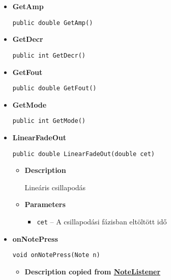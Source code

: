 {{{{{{{{{{{{{{\begin{itemize}
{\begin{itemize}
{Kör-menti csillapodás
}
\item{
{\bf  Parameters}
  \begin{itemize}
   \item{
\texttt{cet} -- A csillapodási fázisban eltöltött idő}
  \end{itemize}
}%
\end{itemize}
}%
\item{ 
\hypertarget{main.OSC.GetAmp()}{{\bf  GetAmp}\\}
\begin{lstlisting}[frame=none]
public double GetAmp()\end{lstlisting} %
}%
\item{ 
\hypertarget{main.OSC.GetDecr()}{{\bf  GetDecr}\\}
\begin{lstlisting}[frame=none]
public int GetDecr()\end{lstlisting} %
}%
\item{ 
\hypertarget{main.OSC.GetFout()}{{\bf  GetFout}\\}
\begin{lstlisting}[frame=none]
public double GetFout()\end{lstlisting} %
}%
\item{ 
\hypertarget{main.OSC.GetMode()}{{\bf  GetMode}\\}
\begin{lstlisting}[frame=none]
public int GetMode()\end{lstlisting} %
}%
\item{ 
\hypertarget{main.OSC.LinearFadeOut(double)}{{\bf  LinearFadeOut}\\}
\begin{lstlisting}[frame=none]
public double LinearFadeOut(double cet)\end{lstlisting} %
\begin{itemize}
\item{
{\bf  Description}

Lineáris csillapodás
}
\item{
{\bf  Parameters}
  \begin{itemize}
   \item{
\texttt{cet} -- A csillapodási fázisban eltöltött idő}
  \end{itemize}
}%
\end{itemize}
}%
\item{ 
\hypertarget{main.OSC.onNotePress(main.Note)}{{\bf  onNotePress}\\}
\begin{lstlisting}[frame=none]
void onNotePress(Note n)\end{lstlisting} %
\begin{itemize}
\item{
{\bf  Description copied from \hyperlink{main.NoteListener}{NoteListener}{\small {}} }

}
\end{itemize}}
\end{itemize}}}}}}}}}}}}}}}

